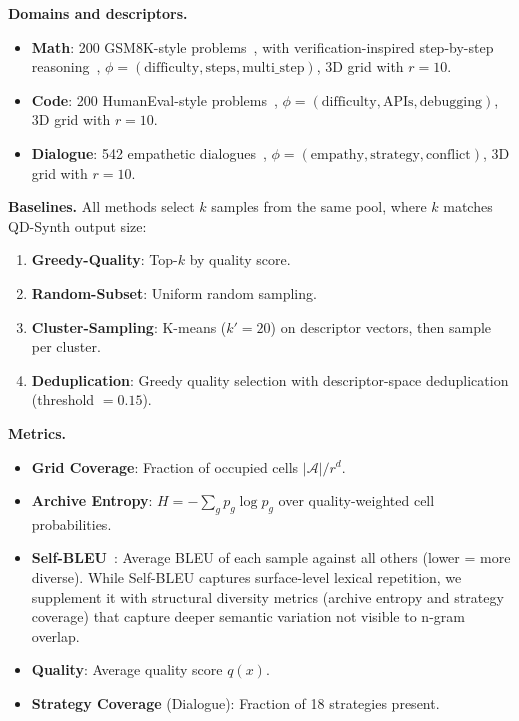 \documentclass{article}
\begin{document}
\begin{enumerate}[nosep]
\textbf{Domains and descriptors.}
\begin{itemize}[nosep]
  \item \textbf{Math}: 200 GSM8K-style problems~\citep{gsm8k_2021}, with verification-inspired step-by-step reasoning~\citep{lightman2023lets}, $\phi = (\text{difficulty}, \text{steps}, \text{multi\_step})$, 3D grid with $r=10$.
  \item \textbf{Code}: 200 HumanEval-style problems~\citep{humaneval_2021}, $\phi = (\text{difficulty}, \text{APIs}, \text{debugging})$, 3D grid with $r=10$.
  \item \textbf{Dialogue}: 542 empathetic dialogues~\citep{ccse_cs_2026}, $\phi = (\text{empathy}, \text{strategy}, \text{conflict})$, 3D grid with $r=10$.
\end{itemize}

\textbf{Baselines.} All methods select $k$ samples from the same pool, where $k$ matches QD-Synth output size:
\begin{enumerate}[nosep]
  \item \textbf{Greedy-Quality}: Top-$k$ by quality score.
  \item \textbf{Random-Subset}: Uniform random sampling.
  \item \textbf{Cluster-Sampling}: K-means ($k'=20$) on descriptor vectors, then sample per cluster.
  \item \textbf{Deduplication}: Greedy quality selection with descriptor-space deduplication (threshold $= 0.15$).
\end{enumerate}

\textbf{Metrics.}
\begin{itemize}[nosep]
  \item \textbf{Grid Coverage}: Fraction of occupied cells $|\mathcal{A}|/r^d$.
  \item \textbf{Archive Entropy}: $H = -\sum_g p_g \log p_g$ over quality-weighted cell probabilities.
  \item \textbf{Self-BLEU}~\citep{self_bleu_2017}: Average BLEU of each sample against all others (lower = more diverse). While Self-BLEU captures surface-level lexical repetition, we supplement it with structural diversity metrics (archive entropy and strategy coverage) that capture deeper semantic variation not visible to n-gram overlap.
  \item \textbf{Quality}: Average quality score $q(x)$.
  \item \textbf{Strategy Coverage} (Dialogue): Fraction of 18 strategies present.
\end{itemize}


\end{enumerate}
\end{document}
